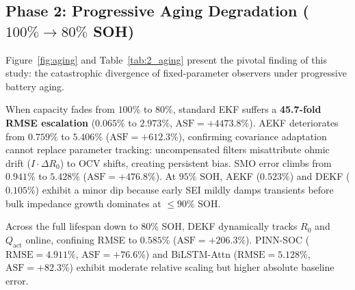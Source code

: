 \documentclass[preprint,12pt]{elsarticle}
\begin{document}
\subsection[Phase 2: Progressive Aging Degradation]{Phase 2: Progressive Aging Degradation ($100\% \rightarrow 80\%$ SOH)}
Figure~\ref{fig:aging} and Table~\ref{tab:2_aging} present the pivotal finding of this study: the catastrophic divergence of fixed-parameter observers under progressive battery aging.

When capacity fades from $100\%$ to $80\%$, standard EKF suffers a \textbf{45.7-fold RMSE escalation} ($0.065\%$ to $2.973\%$, $\text{ASF} = +4473.8\%$). AEKF deteriorates from $0.759\%$ to $5.406\%$ ($\text{ASF} = +612.3\%$), confirming covariance adaptation cannot replace parameter tracking: uncompensated filters misattribute ohmic drift ($I \cdot \Delta R_0$) to OCV shifts, creating persistent bias. SMO error climbs from $0.941\%$ to $5.428\%$ ($\text{ASF} = +476.8\%$). At $95\%$ SOH, AEKF ($0.523\%$) and DEKF ($0.105\%$) exhibit a minor dip because early SEI mildly damps transients before bulk impedance growth dominates at $\le 90\%$ SOH.

Across the full lifespan down to $80\%$ SOH, DEKF dynamically tracks $R_0$ and $Q_{\text{act}}$ online, confining RMSE to $0.585\%$ ($\text{ASF} = +206.3\%$). PINN-SOC ($\text{RMSE} = 4.911\%$, $\text{ASF} = +76.6\%$) and BiLSTM-Attn ($\text{RMSE} = 5.128\%$, $\text{ASF} = +82.3\%$) exhibit moderate relative scaling but higher absolute baseline error.

\begin{table}[htbp]
\caption{Degradation benchmark across progressive SOH stages [Tier~2 Calibrated Co-Simulation, anchored to Tier~1 RPT checkpoints at $100\%, 90\%, 80\%$ SOH; $95\%, 85\%$ SOH evaluated via Eq.~\eqref{eqn:aging_q}--\eqref{eqn:aging_r1}]\label{tab:2_aging}}
%
\end{table}
\end{document}
